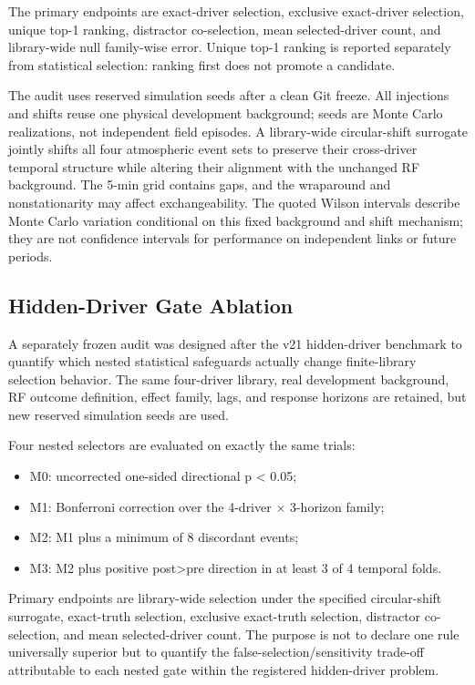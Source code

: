 \documentclass{ieeeaccess}
\providecommand{\tightlist}{\setlength{\itemsep}{0pt}\setlength{\parskip}{0pt}}
\begin{document}
The primary endpoints are exact-driver selection, exclusive exact-driver selection, unique top-1 ranking, distractor co-selection, mean selected-driver count, and library-wide null family-wise error. Unique top-1 ranking is reported separately from statistical selection: ranking first does not promote a candidate.

The audit uses reserved simulation seeds after a clean Git freeze. All injections and shifts reuse one physical development background; seeds are Monte Carlo realizations, not independent field episodes. A library-wide circular-shift surrogate jointly shifts all four atmospheric event sets to preserve their cross-driver temporal structure while altering their alignment with the unchanged RF background. The 5-min grid contains gaps, and the wraparound and nonstationarity may affect exchangeability. The quoted Wilson intervals describe Monte Carlo variation conditional on this fixed background and shift mechanism; they are not confidence intervals for performance on independent links or future periods.

\subsection{Hidden-Driver Gate Ablation}\label{hidden-driver-gate-ablation}

A separately frozen audit was designed after the v21 hidden-driver benchmark to quantify which nested statistical safeguards actually change finite-library selection behavior. The same four-driver library, real development background, RF outcome definition, effect family, lags, and response horizons are retained, but new reserved simulation seeds are used.

Four nested selectors are evaluated on exactly the same trials:

\begin{itemize}
\tightlist
\item
  M0: uncorrected one-sided directional p \textless{} 0.05;
\item
  M1: Bonferroni correction over the 4-driver × 3-horizon family;
\item
  M2: M1 plus a minimum of 8 discordant events;
\item
  M3: M2 plus positive post\textgreater pre direction in at least 3 of 4 temporal folds.
\end{itemize}

Primary endpoints are library-wide selection under the specified circular-shift surrogate, exact-truth selection, exclusive exact-truth selection, distractor co-selection, and mean selected-driver count. The purpose is not to declare one rule universally superior but to quantify the false-selection/sensitivity trade-off attributable to each nested gate within the registered hidden-driver problem.
\end{document}
